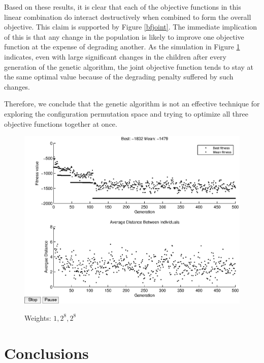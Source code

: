 \documentclass[11pt]{article}
\begin{document}
Based on these results, it is clear that each of the objective functions in this linear combination do interact destructively when combined to form the overall objective. This claim is supported by Figure \ref{bfjoint}. The immediate implication of this is that any change in the population is likely to improve one objective function at the expense of degrading another. As the simulation in Figure \ref{joint8} indicates, even with large significant changes in the children after every generation of the genetic algorithm, the joint objective function tends to stay at the same optimal value because of the degrading penalty suffered by such changes. 

Therefore, we conclude that the genetic algorithm is not an effective technique for exploring the configuration permutation space and trying to optimize all three objective functions together at once. 

\begin{figure}
	\centering
	\includegraphics[scale=0.5]{images/joint_results16.eps} \\
	\label{joint8}
\caption{Weights: $1, 2^8, 2^8$}
\end{figure}


\section{Conclusions}
\end{document}

